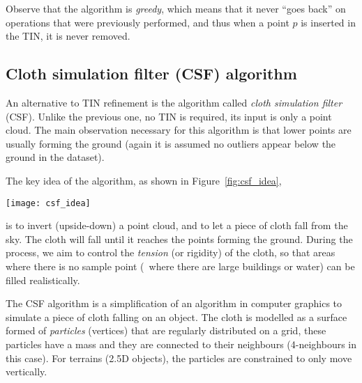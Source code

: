 Observe that the algorithm is \emph{greedy}, which means that it never ``goes back'' on operations that were previously performed, and thus when a point $p$ is inserted in the TIN, it is never removed.

%



%
\subsection{Cloth simulation filter (CSF) algorithm}

An alternative to TIN refinement is the algorithm called \emph{cloth simulation filter} (CSF).
Unlike the previous one, no TIN is required, its input is only a point cloud.
The main observation necessary for this algorithm is that lower points are usually forming the ground (again it is assumed no outliers appear below the ground in the dataset).

%

The key idea of the algorithm, as shown in Figure~\ref{fig:csf_idea},
\begin{figure*}
  \centering
  \texttt{[image: csf\_idea]}
  \caption{Basic idea behind the CSF algorithm for ground filtering of a point cloud: inverting the data and letting a cloth fall.}%
\label{fig:csf_idea}
\end{figure*}
is to invert (upside-down) a point cloud, and to let a piece of cloth fall from the sky.
The cloth will fall until it reaches the points forming the ground.
During the process, we aim to control the \emph{tension} (or rigidity) of the cloth, so that areas where there is no sample point (\eg\ where there are large buildings or water) can be filled realistically.

%

The CSF algorithm is a simplification of an algorithm in computer graphics to simulate a piece of cloth falling on an object.
The cloth is modelled as a surface formed of \emph{particles} (vertices) that are regularly distributed on a grid, these particles have a mass and they are connected to their neighbours (4-neighbours in this case).
For terrains (2.5D objects), the particles are constrained to only move vertically.

